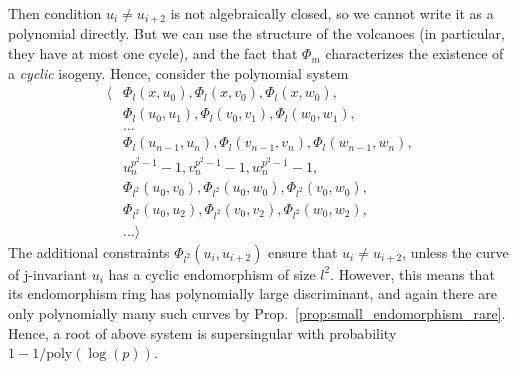 Then condition $u_i \neq u_{i + 2}$ is not algebraically closed, so we cannot write it as a polynomial directly.
But we can use the structure of the volcanoes (in particular, they have at most one cycle), and the fact that $\Phi_m$ characterizes the existence of a \emph{cyclic} isogeny.
Hence, consider the polynomial system
\begin{align*}
    \langle &\Phi_l(x, u_0), \Phi_l(x, v_0), \Phi_l(x, w_0), \\
    &\Phi_l(u_0, u_1), \Phi_l(v_0, v_1), \Phi_l(w_0, w_1), \\
    &... \\
    &\Phi_l(u_{n - 1}, u_n), \Phi_l(v_{n - 1}, v_n), \Phi_l(w_{n - 1}, w_n), \\
    &u_n^{p^2 - 1} - 1, v_n^{p^2 - 1} - 1, w_n^{p^2 - 1} - 1, \\
    &\Phi_{l^2}(u_0, v_0), \Phi_{l^2}(u_0, w_0), \Phi_{l^2}(v_0, w_0), \\
    &\Phi_{l^2}(u_0, u_2), \Phi_{l^2}(v_0, v_2), \Phi_{l^2}(w_0, w_2), \\
    &... \rangle
\end{align*}
The additional constraints $\Phi_{l^2}(u_i, u_{i + 2})$ ensure that $u_i \neq u_{i + 2}$, unless the curve of j-invariant $u_i$ has a cyclic endomorphism of size $l^2$.
However, this means that its endomorphism ring has polynomially large discriminant, and again there are only polynomially many such curves by Prop.~\ref{prop:small_endomorphism_rare}.
Hence, a root of above system is supersingular with probability $1 - 1/\mathrm{poly}(\log(p))$. 

